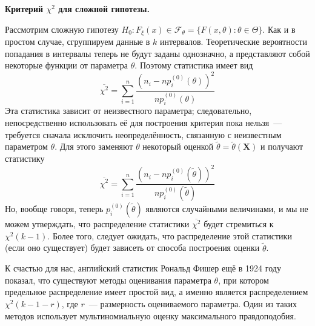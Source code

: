 \noindent \textbf{Критерий $\chi^2$ для сложной гипотезы.}

Рассмотрим сложную гипотезу $H_0\colon F_{\xi}(x) \in \mathcal{F}_{\theta} = \bigl\{ F(x, \theta)\colon \theta \in \Theta\bigr\}$.
Как и в простом случае, сгруппируем данные в $k$ интервалов. 
Теоретические вероятности попадания в интервалы теперь не будут заданы однозначно, а представляют собой некоторые функции от параметра $\theta$.
Поэтому статистика имеет вид 
\begin{equation*}
    \overline{\chi^2} = \sum\limits_{i = 1}^{n} \frac{\left(n_i - n p_{i}^{(0)}(\theta)\right)^2}{n p_{i}^{(0)}(\theta)}
\end{equation*}
Эта статистика зависит от неизвестного параметра; следовательно, непосредственно использовать её для построения критерия пока нельзя~---
требуется сначала исключить неопределённость, связанную с неизвестным параметром $\theta$.
Для этого заменяют $\theta$ некоторый оценкой $\tilde{\theta} = \tilde{\theta}(\mathbf{X})$ и получают статистику
\begin{equation*}
    \overline{\chi^2} = \sum\limits_{i = 1}^{n} \frac{\left(n_i - n p_{i}^{(0)}(\tilde{\theta}) \right)^2}{n p_{i}^{(0)}(\tilde{\theta})}
\end{equation*}
Но, вообще говоря, теперь $p_{i}^{(0)}(\tilde{\theta})$ являются случайными величинами, и мы не можем утверждать, что распределение статистики $\overline{\chi^2}$ будет стремиться к $\chi^2(k-1)$.
Более того, следует ожидать, что распределение этой статистики (если оно существует) будет зависеть от способа построения оценки $\tilde{\theta}$.

К счастью для нас, английский статистик Рональд Фишер ещё в 1924 году показал, что существуют методы оценивания параметра $\theta$, 
при котором предельное распределение имеет простой вид, а именно является распределением $\chi^2(k - 1 - r)$, где $r$~--- размерность оцениваемого параметра.
Один из таких методов использует мультиномиальную оценку максимального правдоподобия.


